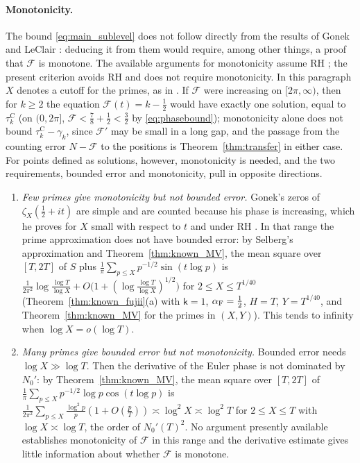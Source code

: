 \documentclass[11pt,a4paper]{article}
\makeatletter
\numberwithin{equation}{section}
\DeclareRobustCommand{\CGref}[1]{\ref{#1}}
\DeclareRobustCommand{\CGeqref}[1]{\eqref{#1}}
\DeclareRobustCommand{\CGcite}[2][]{\if\relax\detokenize{#1}\relax\cite{#2}\else\cite[#1]{#2}\fi}
\let\CG@origref\ref
\let\CG@origeqref\eqref
\newcommand{\CG@gettip}[1]{\@ifundefined{CGTip@#1}{#1}{\csname CGTip@#1\endcsname}}
\newcommand{\CG@getbib}[1]{\@ifundefined{CGBib@#1}{#1}{\csname CGBib@#1\endcsname}}
\DeclareRobustCommand{\CGref}[1]{\pdftooltip{\CG@origref{#1}}{\CG@gettip{#1}}}
\DeclareRobustCommand{\CGeqref}[1]{\pdftooltip{\CG@origeqref{#1}}{\CG@gettip{#1}}}
\DeclareRobustCommand{\CGcite}[2][]{\pdftooltip{\if\relax\detokenize{#1}\relax\cite{#2}\else\cite[#1]{#2}\fi}{\CG@getbib{#2}}}
\theoremstyle{definition}
\theoremstyle{remark}
\newcommand{\Nz}{N_0} %
\newcommand{\Fc}{\mathcal F}
\makeatother
\begin{document}
\paragraph{Monotonicity.}
The bound \CGeqref{eq:main_sublevel} does not follow directly from the results of Gonek \CGcite{Gonek2012} and LeClair \CGcite{LeClair2016}: deducing it from them would require, among other things, a proof that $\Fc$ is monotone. The available arguments for monotonicity assume RH \CGcite[Thm.~8.1 and \S10]{Gonek2012}; the present criterion avoids RH and does not require monotonicity. In this paragraph $X$ denotes a cutoff for the primes, as in \CGcite{Gonek2012}. If $\Fc$ were increasing on $[2\pi,\infty)$, then for $k\ge2$ the equation $\Fc(t)=k-\frac12$ would have exactly one solution, equal to $\tau_{k}^{\mathrm C}$ (on $(0,2\pi]$, $\Fc<\frac78+\frac12<\frac32$ by \CGeqref{eq:phasebound}); monotonicity alone does not bound $\tau_{k}^{\mathrm C}-\gamma_k$, since $\Fc'$ may be small in a long gap, and the passage from the counting error $N-\Fc$ to the positions is Theorem~\CGref{thm:transfer} in either case. For points defined as solutions, however, monotonicity is needed, and the two requirements, bounded error and monotonicity, pull in opposite directions.
\begin{enumerate}
\item \emph{Few primes give monotonicity but not bounded error.} Gonek's zeros of $\zeta_X(\frac12+it)$ are simple and are counted because his phase is increasing, which he proves for $X$ small with respect to $t$ and under RH \CGcite[Thm.~8.1 and \S10]{Gonek2012}. In that range the prime approximation does not have bounded error: by Selberg's approximation \CGcite[\S3]{Fujii1974} and Theorem~\CGref{thm:known_MV}, the mean square over $[T,2T]$ of $S$ plus $\frac1\pi\sum_{p\le X}p^{-1/2}\sin(t\log p)$ is $\frac1{2\pi^2}\log\frac{\log T}{\log X}+O\bigl(1+(\log\frac{\log T}{\log X})^{1/2}\bigr)$ for $2\le X\le T^{1/40}$ (Theorem~\CGref{thm:known_fujii}(a) with $\mathsf k=1$, $\alpha_{\rm F}=\frac12$, $H=T$, $Y=T^{1/40}$, and Theorem~\CGref{thm:known_MV} for the primes in $(X,Y)$). This tends to infinity when $\log X=o(\log T)$.
\item \emph{Many primes give bounded error but not monotonicity.} Bounded error needs $\log X\gg\log T$. Then the derivative of the Euler phase is not dominated by $\Nz'$: by Theorem~\CGref{thm:known_MV}, the mean square over $[T,2T]$ of $\frac1\pi\sum_{p\le X}p^{-1/2}\log p\cos(t\log p)$ is $\frac{1}{2\pi^2}\sum_{p\le X}\frac{\log^2p}{p}(1+O(\frac{p}{T}))\asymp\log^2X\asymp\log^2T$ for $2\le X\le T$ with $\log X\asymp\log T$, the order of $\Nz'(T)^2$. No argument presently available establishes monotonicity of $\Fc$ in this range and the derivative estimate gives little information about whether $\Fc$ is monotone.
\end{enumerate}
\end{document}

